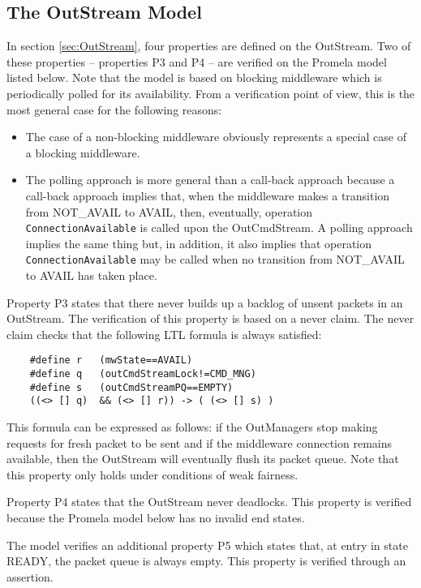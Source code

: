 \documentclass{pnp_article}
\begin{document}
\subsection{The OutStream Model}\label{sec:OutStreamModel}

In section \ref{sec:OutStream}, four properties are defined on the OutStream. Two of these properties – properties P3 and P4 – are verified on the Promela model listed below. Note that the model is based on blocking middleware which is periodically polled for its availability. From a verification point of view, this is the most general case for the following reasons:
\begin{itemize}
\item The case of a non-blocking middleware obviously represents a special case of a blocking middleware.
\item The polling approach is more general than a call-back approach because a call-back approach implies that, when the middleware makes a transition from NOT\_AVAIL to AVAIL, then, eventually, operation \texttt{ConnectionAvailable} is called upon the OutCmdStream. A polling approach implies the same thing but, in addition, it also implies that operation \texttt{ConnectionAvailable} may be called when no transition from NOT\_AVAIL to AVAIL has taken place.
\end{itemize}
Property P3 states that there never builds up a backlog of unsent packets in an OutStream. The verification of this property is based on a never claim. The never claim checks that the following LTL formula is always satisfied:

\lstset{belowskip=-14pt} %
\begin{lstlisting}
	#define r	(mwState==AVAIL)
	#define q	(outCmdStreamLock!=CMD_MNG)
	#define s	(outCmdStreamPQ==EMPTY)
	((<> [] q)  && (<> [] r)) -> ( (<> [] s) )
\end{lstlisting}

This formula can be expressed as follows: if the OutManagers stop making requests for fresh packet to be sent and if the middleware connection remains available, then the OutStream will eventually flush its packet queue. Note that this property only holds under conditions of weak fairness. 

Property P4 states that the OutStream never deadlocks. This property is verified because the Promela model below has no invalid end states.

The model verifies an additional property P5 which states that, at entry in state READY, the packet queue is always empty. This property is verified through an assertion.

\lstset{belowskip=-1pt}	%

\end{document}
